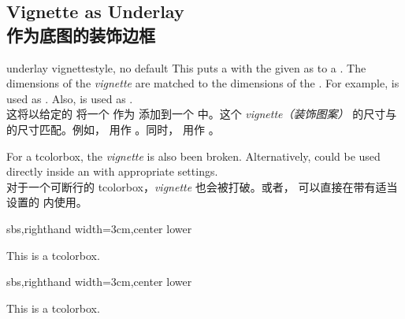 \subsection{Vignette as Underlay\\作为底图的装饰边框}\label{subsec:vignetteunderlay}

\begin{docTcbKey}[][doc new=2016-04-22]{underlay vignette}{}{style, no default}
This puts a  with the given 
as  to a .
The dimensions of the \emph{vignette} are matched to the dimensions of
the . For example,  is used as
. Also,  is used as
.
\\这将以给定的  将一个  作为  添加到一个  中。这个 \emph{vignette（装饰图案）} 的尺寸与  的尺寸匹配。例如， 用作 。同时， 用作 。

For a  tcolorbox, the \emph{vignette} is also
been broken.
Alternatively,  could be used directly inside
an  with appropriate settings.
\\对于一个可断行的  tcolorbox，\emph{vignette} 也会被打破。或者， 可以直接在带有适当设置的  内使用。

\begin{dispExample*}{sbs,righthand width=3cm,center lower}
\begin{tcolorbox}[enhanced,size=small,sharp corners,
colback=green!10,colframe=green!50!black,
boxrule=2mm,titlerule=0mm,
title=My title,center title,fonttitle=\bfseries,
underlay vignette]
This is a tcolorbox.
\end{tcolorbox}
\end{dispExample*}

\begin{dispExample*}{sbs,righthand width=3cm,center lower}
\begin{tcolorbox}[enhanced,size=small,arc=0pt,
colback=blue!10,colframe=blue,boxrule=2mm,
underlay vignette={size=1.5mm}]
This is a tcolorbox.
\end{tcolorbox}
\end{dispExample*}


\end{docTcbKey}

